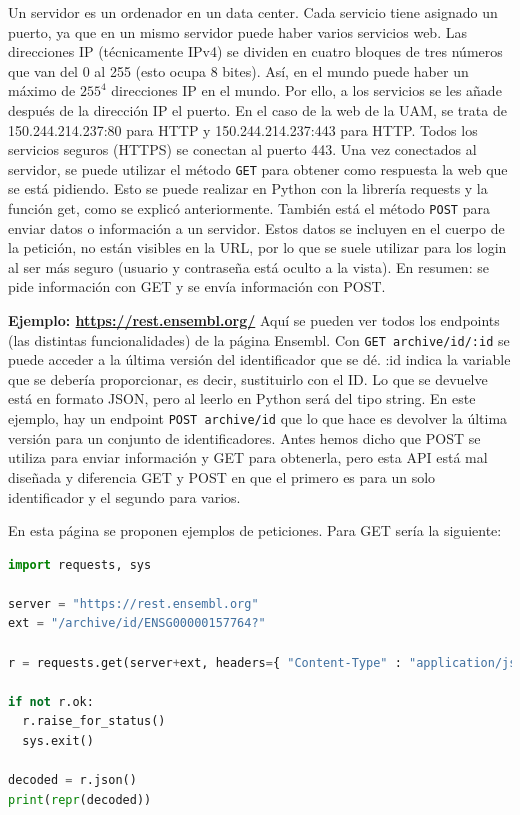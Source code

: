 Un servidor es un ordenador en un data center. Cada servicio tiene asignado un puerto, ya que en un mismo servidor puede haber varios servicios web. Las direcciones IP (técnicamente IPv4) se dividen en cuatro bloques de tres números que van del 0 al 255 (esto ocupa 8 bites). Así, en el mundo puede haber un máximo de $255^4$ direcciones IP en el mundo. Por ello, a los servicios se les añade después de la dirección IP el puerto. En el caso de la web de la UAM, se trata de 150.244.214.237:80 para HTTP y 150.244.214.237:443 para HTTP. Todos los servicios seguros (HTTPS) se conectan al puerto 443. Una vez conectados al servidor, se puede utilizar el método \texttt{GET} para obtener como respuesta la web que se está pidiendo. Esto se puede realizar en Python con la librería requests y la función get, como se explicó anteriormente. También está el método \texttt{POST} para enviar datos o información a un servidor. Estos datos se incluyen en el cuerpo de la petición, no están visibles en la URL, por lo que se suele utilizar para los login al ser más seguro (usuario y contraseña está oculto a la vista). En resumen: se pide información con GET y se envía información con POST. 

\textbf{Ejemplo: \href{https://rest.ensembl.org/}{https://rest.ensembl.org/}}
Aquí se pueden ver todos los endpoints (las distintas funcionalidades) de la página Ensembl. 
Con \texttt{GET archive/id/:id} se puede acceder a la última versión del identificador que se dé. :id indica la variable que se debería proporcionar, es decir, sustituirlo con el ID. Lo que se devuelve está en formato JSON, pero al leerlo en Python será del tipo string. En este ejemplo, hay un endpoint \texttt{POST archive/id} que lo que hace es devolver la última versión para un conjunto de identificadores. Antes hemos dicho que POST se utiliza para enviar información y GET para obtenerla, pero esta API está mal diseñada y diferencia GET y POST en que el primero es para un solo identificador y el segundo para varios.

En esta página se proponen ejemplos de peticiones. Para GET sería la siguiente:
\begin{lstlisting}[language=Python]
import requests, sys
 
server = "https://rest.ensembl.org"
ext = "/archive/id/ENSG00000157764?"
 
r = requests.get(server+ext, headers={ "Content-Type" : "application/json"})
 
if not r.ok:
  r.raise_for_status()
  sys.exit()
 
decoded = r.json()
print(repr(decoded))
\end{lstlisting}

